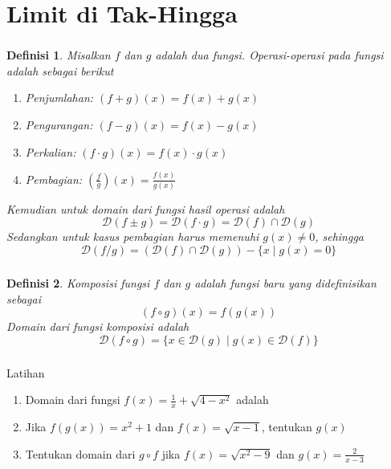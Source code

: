 \documentclass[aspectratio=169]{beamer}
\newtheorem{definisi}{Definisi}
\theoremstyle{definition}
\newcommand{\dom}{\mathcal{D}}
\begin{document}
\section{Limit di Tak-Hingga}
\begin{frame}
    \frametitle{\insertsection}
    \begin{definisi}
        Misalkan $f$ dan $g$ adalah dua fungsi. Operasi-operasi pada fungsi adalah sebagai berikut
        \begin{enumerate}
            \item Penjumlahan: $(f+g)(x)=f(x)+g(x)$
            \item Pengurangan: $(f-g)(x)=f(x)-g(x)$
            \item Perkalian: $(f\cdot g)(x)=f(x)\cdot g(x)$
            \item Pembagian: $\left(\displaystyle\frac{f}{g}\right)(x)=\displaystyle\frac{f(x)}{g(x)}$
        \end{enumerate}
        Kemudian untuk domain dari fungsi hasil operasi adalah \[\dom(f\pm g)=\dom(f\cdot g)=\dom(f)\cap\dom(g)\]
        Sedangkan untuk kasus pembagian harus memenuhi $g(x)\ne 0$, sehingga
        \[\dom\left(f/g\right)=(\dom(f)\cap\dom(g)) - \{x\mid g(x)=0\}\]
    \end{definisi}
\end{frame}

\begin{frame}
    \frametitle{\insertsection}
    \begin{definisi}
        Komposisi fungsi $f$ dan $g$ adalah fungsi baru yang didefinisikan sebagai
        \[(f\circ g)(x)=f(g(x))\]
        Domain dari fungsi komposisi adalah
        \[\dom(f\circ g)=\{x\in\dom(g)\mid g(x)\in\dom(f)\}\]
    \end{definisi}
\end{frame}

\begin{frame}
    \frametitle{\insertsection}
    \begin{exampleblock}{Latihan}
        \begin{enumerate}
            \item Domain dari fungsi $\displaystyle f(x)=\frac{1}{x}+\sqrt{4-x^2}$ adalah
            \item Jika $f(g(x))=x^2+1$ dan $f(x)=\sqrt{x-1}$, tentukan $g(x)$
            \item Tentukan domain dari $g\circ f$ jika $f(x)=\sqrt{x^2-9}$ dan $\displaystyle g(x)=\frac{2}{x-3}$
        \end{enumerate}
    \end{exampleblock}
\end{frame}
\end{document}
